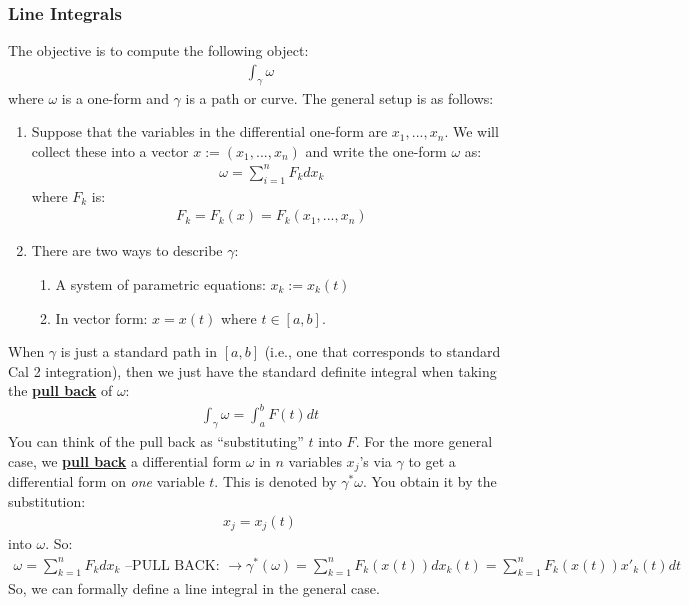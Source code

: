 \documentclass[11pt]{scrartcl}
\theoremstyle{definition}
\theoremstyle{remark}
\newcommand{\dfn}[1]{\textbf{\underline{#1}}}
\newcommand{\idx}[2]{\int_{#1}^{#2}}
\begin{document}
{\subsubsection{Line Integrals}
The objective is to compute the following object: 
\begin{align}
	\idx{\gamma}{} \omega	
\end{align}
where $\omega$ is a one-form and $\gamma$ is a path or curve. The general setup is as follows: 
\begin{enumerate}[noitemsep]
	\item Suppose that the variables in the differential one-form are $x_1, ..., x_n$. We will collect these into a vector $x:= (x_1, ..., x_n)$ and write the one-form $\omega$ as: 
	\begin{align*}
		\omega = \sum_{i=1}^n F_k dx_k 
	\end{align*}
	where $F_k$ is: 
	\begin{align*}
		F_k = F_k(x) = F_k(x_1, ..., x_n)
	\end{align*}
	\item There are two ways to describe $\gamma$: 
	\begin{enumerate}[noitemsep]	
		\item A system of parametric equations: $x_k := x_k(t)$ 
		\item In vector form: $x=x(t)$ where $t \in [a,b]$. 
	\end{enumerate}
\end{enumerate}
When $\gamma$ is just a standard path in $[a,b]$ (i.e., one that corresponds to standard Cal 2 integration), then we just have the standard definite integral when taking the \dfn{pull back} of $\omega$: 
\begin{align*}
	\idx{\gamma}{} \omega = \idx{a}{b} F(t) dt 
\end{align*}
You can think of the pull back as ``substituting'' $t$ into $F$. For the more general case, we \dfn{pull back} a differential form $\omega$ in $n$ variables $x_j$'s via $\gamma$ to get a differential form on \emph{one} variable $t$. This is denoted by $\gamma^* \omega$. You obtain it by the substitution: 
\begin{align*}
	x_j = x_j(t) 
\end{align*}
into $\omega$. So: 
\begin{align*}
	\omega = \sum_{k=1}^n F_k dx_k \text{ --PULL BACK: } \rightarrow \gamma^*(\omega) = \sum_{k=1}^n F_k(x(t)) dx_k (t) = \sum_{k=1}^n F_k(x(t))x'_k(t) dt  
\end{align*}
So, we can formally define a line integral in the general case. 

}
\end{document}

